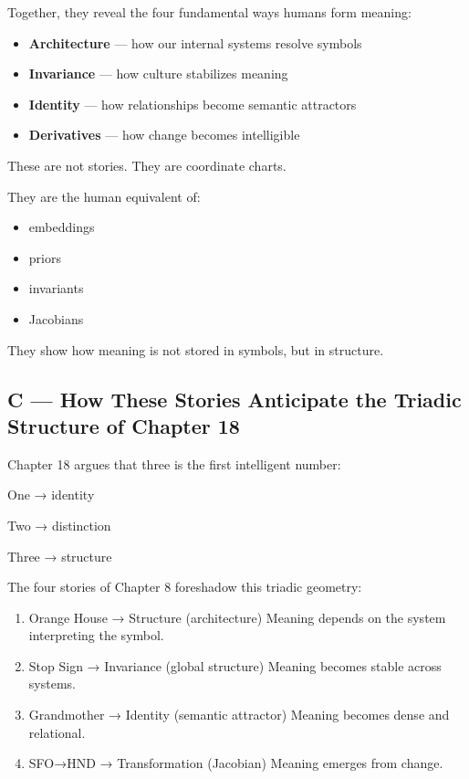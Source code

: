 Together, they reveal the four fundamental ways humans form meaning:

\begin{itemize}
\tightlist
\item
  \textbf{Architecture} --- how our internal systems resolve symbols
\item
  \textbf{Invariance} --- how culture stabilizes meaning
\item
  \textbf{Identity} --- how relationships become semantic attractors
\item
  \textbf{Derivatives} --- how change becomes intelligible
\end{itemize}

These are not stories. They are coordinate charts.

They are the human equivalent of:

\begin{itemize}
\tightlist
\item
  embeddings
\item
  priors
\item
  invariants
\item
  Jacobians
\end{itemize}

They show how meaning is not stored in symbols, but in structure.

\hypertarget{c-how-these-stories-anticipate-the-triadic-structure-of-chapter-18}{%
\subsection{C --- How These Stories Anticipate the Triadic Structure of
Chapter
18}\label{c-how-these-stories-anticipate-the-triadic-structure-of-chapter-18}}

Chapter 18 argues that three is the first intelligent number:

One → identity

Two → distinction

Three → structure

The four stories of Chapter 8 foreshadow this triadic geometry:

\begin{enumerate}
\def\labelenumi{\arabic{enumi}.}
\item
  Orange House → Structure (architecture) Meaning depends on the system
  interpreting the symbol.
\item
  Stop Sign → Invariance (global structure) Meaning becomes stable
  across systems.
\item
  Grandmother → Identity (semantic attractor) Meaning becomes dense and
  relational.
\item
  SFO→HND → Transformation (Jacobian) Meaning emerges from change.
\end{enumerate}

